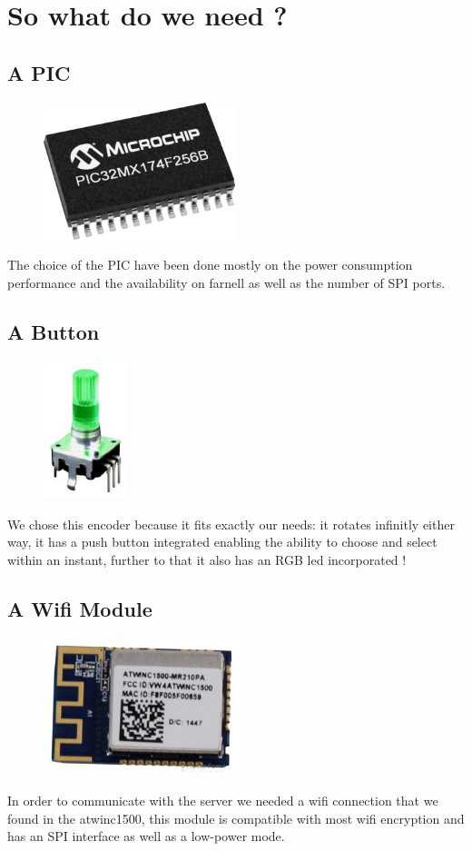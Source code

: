 \documentclass[12pt,a4paper,landscape]{article}
\begin{document}
\section*{So what do we need ?}
	\begin{multicols}{2}
	\subsection*{A PIC}
		\begin{figure}[H]
		\centering
		\includegraphics[height=4cm]{images/pic32.png}
		\end{figure}
		The choice of the PIC have been done mostly on the power consumption performance and the availability on farnell as well as the number of SPI ports.

	\subsection*{A Button}
			\begin{figure}[H]
			\centering
			\includegraphics[height=4cm]{images/rotary_encoder.png}
			\end{figure}
			We chose this encoder because it fits exactly our needs: it rotates infinitly either way, it has a push button integrated enabling the ability to choose and select within an instant, further to that it also has an RGB led incorporated !

	\subsection*{A Wifi Module}
			\begin{figure}[H]
			\centering
			\includegraphics[height=4cm]{images/atwinc1500.png}
			\end{figure}
			In order to communicate with the server we needed a wifi connection that we found in the atwinc1500, this module is compatible with most wifi encryption and has an SPI interface as well as a low-power mode.


\end{multicols}
\end{document}
